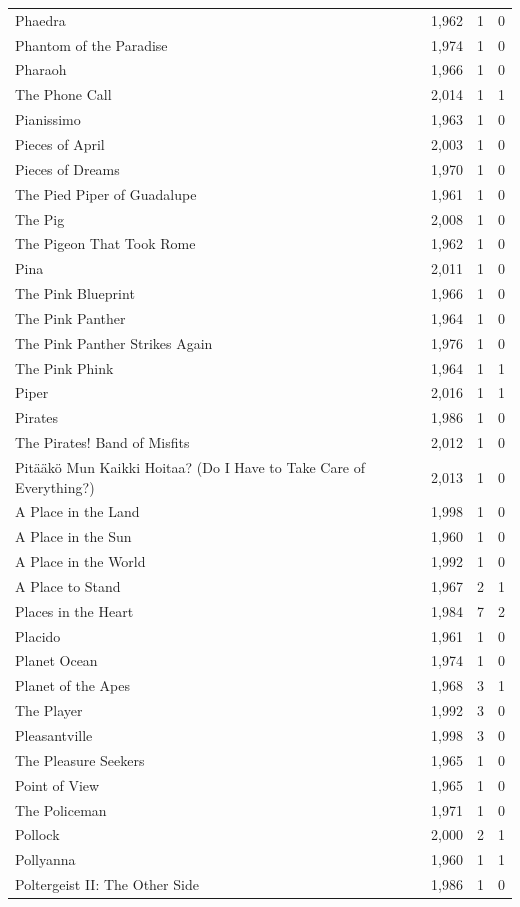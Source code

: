 \begin{tabular}{lrrr}
Phaedra & 1,962 & 1 & 0 \\
Phantom of the Paradise & 1,974 & 1 & 0 \\
Pharaoh & 1,966 & 1 & 0 \\
The Phone Call & 2,014 & 1 & 1 \\
Pianissimo & 1,963 & 1 & 0 \\
Pieces of April & 2,003 & 1 & 0 \\
Pieces of Dreams & 1,970 & 1 & 0 \\
The Pied Piper of Guadalupe & 1,961 & 1 & 0 \\
The Pig & 2,008 & 1 & 0 \\
The Pigeon That Took Rome & 1,962 & 1 & 0 \\
Pina & 2,011 & 1 & 0 \\
The Pink Blueprint & 1,966 & 1 & 0 \\
The Pink Panther & 1,964 & 1 & 0 \\
The Pink Panther Strikes Again & 1,976 & 1 & 0 \\
The Pink Phink & 1,964 & 1 & 1 \\
Piper & 2,016 & 1 & 1 \\
Pirates & 1,986 & 1 & 0 \\
The Pirates! Band of Misfits & 2,012 & 1 & 0 \\
Pitääkö Mun Kaikki Hoitaa? (Do I Have to Take Care of Everything?) & 2,013 & 1 & 0 \\
A Place in the Land & 1,998 & 1 & 0 \\
A Place in the Sun & 1,960 & 1 & 0 \\
A Place in the World & 1,992 & 1 & 0 \\
A Place to Stand & 1,967 & 2 & 1 \\
Places in the Heart & 1,984 & 7 & 2 \\
Placido & 1,961 & 1 & 0 \\
Planet Ocean & 1,974 & 1 & 0 \\
Planet of the Apes & 1,968 & 3 & 1 \\
The Player & 1,992 & 3 & 0 \\
Pleasantville & 1,998 & 3 & 0 \\
The Pleasure Seekers & 1,965 & 1 & 0 \\
Point of View & 1,965 & 1 & 0 \\
The Policeman & 1,971 & 1 & 0 \\
Pollock & 2,000 & 2 & 1 \\
Pollyanna & 1,960 & 1 & 1 \\
Poltergeist II: The Other Side & 1,986 & 1 & 0 \\

\end{tabular}
